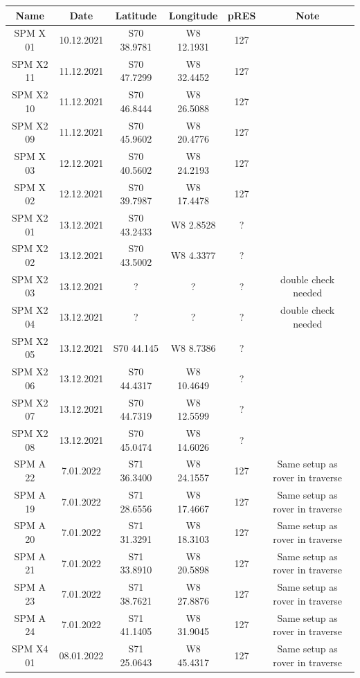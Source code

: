 \documentclass[a4paper,12pt]{article}
\begin{document}
\begin{table}[H]
  \tiny
  \centering
  \begin{tabular}[width=\textwidth]{c c c c c c}
    \rowcolor{gray!50}
    Name & Date & Latitude & Longitude & pRES & Note\\
    \hline
    SPM X 01 & 10.12.2021 & S70 38.9781 & W8 12.1931 & 127 &  \\
    SPM X2 11 & 11.12.2021 & S70 47.7299 & W8 32.4452 & 127 &  \\
    SPM X2 10 & 11.12.2021 & S70 46.8444 & W8 26.5088 & 127 &  \\
    SPM X2 09 & 11.12.2021 & S70 45.9602 & W8 20.4776 & 127 &  \\
    SPM X 03 & 12.12.2021 & S70 40.5602 & W8 24.2193 & 127 &  \\
    SPM X 02 & 12.12.2021 & S70 39.7987 & W8 17.4478 & 127 &  \\
    SPM X2 01 & 13.12.2021 & S70 43.2433 & W8 2.8528 & ? &  \\
    SPM X2 02 & 13.12.2021 & S70 43.5002 & W8 4.3377 & ? &  \\ 
    SPM X2 03 & 13.12.2021 & ? & ? & ? & double check needed \\
    SPM X2 04 & 13.12.2021 & ? & ? & ? & double check needed \\
    SPM X2 05 & 13.12.2021 & S70 44.145 & W8 8.7386 & ? &  \\
    SPM X2 06 & 13.12.2021 & S70 44.4317 & W8 10.4649 & ? &  \\
    SPM X2 07 & 13.12.2021 & S70 44.7319 & W8 12.5599 & ? &  \\
    SPM X2 08 & 13.12.2021 & S70 45.0474 & W8 14.6026 & ? &  \\
    SPM A 22 & 7.01.2022 & S71 36.3400 & W8 24.1557 & 127 & Same setup as rover in traverse\\
    SPM A 19 & 7.01.2022 & S71 28.6556 & W8 17.4667 & 127 & Same setup as rover in traverse\\
    SPM A 20 & 7.01.2022 & S71 31.3291 & W8 18.3103 & 127 & Same setup as rover in traverse\\
    SPM A 21 & 7.01.2022 & S71 33.8910 & W8 20.5898 & 127 & Same setup as rover in traverse\\
    SPM A 23 & 7.01.2022 & S71 38.7621 & W8 27.8876 & 127 & Same setup as rover in traverse\\
    SPM A 24 & 7.01.2022 & S71 41.1405 & W8 31.9045 & 127 & Same setup as rover in traverse\\
    SPM X4 01 & 08.01.2022 & S71 25.0643 & W8 45.4317 & 127 & Same setup as rover in traverse\\

\end{tabular}
\end{table}
\end{document}
